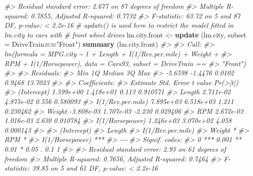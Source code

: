 \documentclass[
]{book}
\newenvironment{Shaded}{\begin{snugshade}}{\end{snugshade}}
\newcommand{\AttributeTok}[1]{\textcolor[rgb]{0.13,0.29,0.53}{#1}}
\newcommand{\CommentTok}[1]{\textcolor[rgb]{0.56,0.35,0.01}{\textit{#1}}}
\newcommand{\FunctionTok}[1]{\textcolor[rgb]{0.13,0.29,0.53}{\textbf{#1}}}
\newcommand{\NormalTok}[1]{#1}
\newcommand{\OtherTok}[1]{\textcolor[rgb]{0.56,0.35,0.01}{#1}}
\newcommand{\SpecialCharTok}[1]{\textcolor[rgb]{0.81,0.36,0.00}{\textbf{#1}}}
\newcommand{\StringTok}[1]{\textcolor[rgb]{0.31,0.60,0.02}{#1}}
\begin{document}
\begin{Shaded}
\begin{Highlighting}[]
\CommentTok{\#\textgreater{} Residual standard error: 2.677 on 87 degrees of freedom}
\CommentTok{\#\textgreater{} Multiple R{-}squared:  0.7855, Adjusted R{-}squared:  0.7732 }
\CommentTok{\#\textgreater{} F{-}statistic: 63.72 on 5 and 87 DF,  p{-}value: \textless{} 2.2e{-}16}
\CommentTok{\# update() is used here to restrict the model fitted in lm.city to cars with }
\CommentTok{\# front wheel drives}
\NormalTok{lm.city.front }\OtherTok{\textless{}{-}} \FunctionTok{update}\NormalTok{ (lm.city, }\AttributeTok{subset =}\NormalTok{ DriveTrain}\SpecialCharTok{==}\StringTok{"Front"}\NormalTok{)}
\FunctionTok{summary}\NormalTok{ (lm.city.front)}
\CommentTok{\#\textgreater{} }
\CommentTok{\#\textgreater{} Call:}
\CommentTok{\#\textgreater{} lm(formula = MPG.city \textasciitilde{} 1 + Length + I(1/Rev.per.mile) + Weight + }
\CommentTok{\#\textgreater{}     RPM + I(1/Horsepower), data = Cars93, subset = DriveTrain == }
\CommentTok{\#\textgreater{}     "Front")}
\CommentTok{\#\textgreater{} }
\CommentTok{\#\textgreater{} Residuals:}
\CommentTok{\#\textgreater{}     Min      1Q  Median      3Q     Max }
\CommentTok{\#\textgreater{} {-}5.6598 {-}1.4476  0.0102  0.9468 13.7023 }
\CommentTok{\#\textgreater{} }
\CommentTok{\#\textgreater{} Coefficients:}
\CommentTok{\#\textgreater{}                     Estimate Std. Error t value Pr(\textgreater{}|t|)}
\CommentTok{\#\textgreater{} (Intercept)        1.599e+00  1.418e+01   0.113 0.910571}
\CommentTok{\#\textgreater{} Length             2.711e{-}02  4.875e{-}02   0.556 0.580093}
\CommentTok{\#\textgreater{} I(1/Rev.per.mile)  7.895e+03  6.518e+03   1.211 0.230462}
\CommentTok{\#\textgreater{} Weight            {-}3.808e{-}03  1.707e{-}03  {-}2.230 0.029406}
\CommentTok{\#\textgreater{} RPM                2.672e{-}03  1.016e{-}03   2.630 0.010784}
\CommentTok{\#\textgreater{} I(1/Horsepower)    1.246e+03  3.070e+02   4.058 0.000143}
\CommentTok{\#\textgreater{}                      }
\CommentTok{\#\textgreater{} (Intercept)          }
\CommentTok{\#\textgreater{} Length               }
\CommentTok{\#\textgreater{} I(1/Rev.per.mile)    }
\CommentTok{\#\textgreater{} Weight            *  }
\CommentTok{\#\textgreater{} RPM               *  }
\CommentTok{\#\textgreater{} I(1/Horsepower)   ***}
\CommentTok{\#\textgreater{} {-}{-}{-}}
\CommentTok{\#\textgreater{} Signif. codes:  }
\CommentTok{\#\textgreater{} 0 \textquotesingle{}***\textquotesingle{} 0.001 \textquotesingle{}**\textquotesingle{} 0.01 \textquotesingle{}*\textquotesingle{} 0.05 \textquotesingle{}.\textquotesingle{} 0.1 \textquotesingle{} \textquotesingle{} 1}
\CommentTok{\#\textgreater{} }
\CommentTok{\#\textgreater{} Residual standard error: 2.93 on 61 degrees of freedom}
\CommentTok{\#\textgreater{} Multiple R{-}squared:  0.7656, Adjusted R{-}squared:  0.7464 }
\CommentTok{\#\textgreater{} F{-}statistic: 39.85 on 5 and 61 DF,  p{-}value: \textless{} 2.2e{-}16}


\end{Highlighting}
\end{Shaded}
\end{document}
